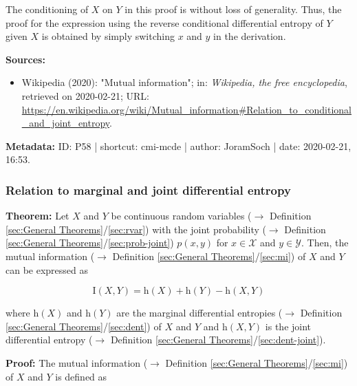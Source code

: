 \documentclass[a4paper,12pt,twoside]{book}
\begin{document}
The conditioning of $X$ on $Y$ in this proof is without loss of generality. Thus, the proof for the expression using the reverse conditional differential entropy of $Y$ given $X$ is obtained by simply switching $x$ and $y$ in the derivation.


\vspace{1em}
\textbf{Sources:}
\begin{itemize}
\item Wikipedia (2020): "Mutual information"; in: \textit{Wikipedia, the free encyclopedia}, retrieved on 2020-02-21; URL: \url{https://en.wikipedia.org/wiki/Mutual_information#Relation_to_conditional_and_joint_entropy}.
\end{itemize}


\vspace{1em}
\textbf{Metadata:} ID: P58 | shortcut: cmi-mcde | author: JoramSoch | date: 2020-02-21, 16:53.
\vspace{1em}



\subsubsection[\textbf{Relation to marginal and joint differential entropy}]{Relation to marginal and joint differential entropy} \label{sec:cmi-mjde}
\setcounter{equation}{0}

\textbf{Theorem:} Let $X$ and $Y$ be continuous random variables ($\rightarrow$ Definition \ref{sec:General Theorems}/\ref{sec:rvar}) with the joint probability ($\rightarrow$ Definition \ref{sec:General Theorems}/\ref{sec:prob-joint}) $p(x,y)$ for $x \in \mathcal{X}$ and $y \in \mathcal{Y}$. Then, the mutual information ($\rightarrow$ Definition \ref{sec:General Theorems}/\ref{sec:mi}) of $X$ and $Y$ can be expressed as

\begin{equation} \label{eq:cmi-mjde-cmi-mjde}
\mathrm{I}(X,Y) = \mathrm{h}(X) + \mathrm{h}(Y) - \mathrm{h}(X,Y)
\end{equation}

where $\mathrm{h}(X)$ and $\mathrm{h}(Y)$ are the marginal differential entropies ($\rightarrow$ Definition \ref{sec:General Theorems}/\ref{sec:dent}) of $X$ and $Y$ and $\mathrm{h}(X,Y)$ is the joint differential entropy ($\rightarrow$ Definition \ref{sec:General Theorems}/\ref{sec:dent-joint}).


\vspace{1em}
\textbf{Proof:} The mutual information ($\rightarrow$ Definition \ref{sec:General Theorems}/\ref{sec:mi}) of $X$ and $Y$ is defined as
\end{document}
